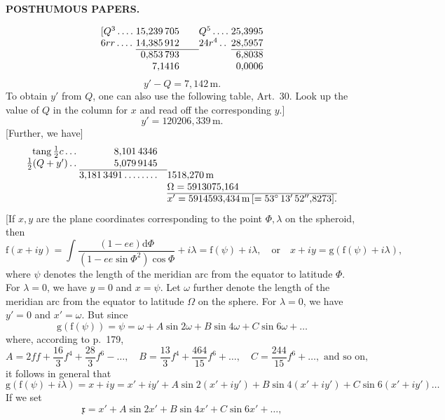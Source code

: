 \par\clearpage
{}\hfill{\small\textbf{POSTHUMOUS PAPERS.}}\hfill\null\par\medskip
\[
\begin{array}{@{}l@{\;}r@{\qquad}l@{\;}r@{}}
[Q^3\,.\,.\,.\,.&15{,}239\,705&Q^5\,.\,.\,.\,.&25{,}3995\\
6rr\,.\,.\,.\,.&14{,}385\,912&24r^4\,.\,.&28{,}5957\\\cline{2-2}\cline{4-4}
&0{,}853\,793&&6{,}8038\\
&7{,}1416&&0{,}0006
\end{array}
\]
\[y'-Q=7{,}142\,\mathrm{m}.\]
To obtain \(y'\) from \(Q\), one can also use the following table, Art.~30. Look up the value of \(Q\) in the column for \(x\) and read off the corresponding \(y\).]
\[y'=120206{,}339\,\mathrm{m}.\]
[Further, we have]
\[
\begin{array}{@{}r@{\;}r@{\quad}l@{}}
\operatorname{tang}\tfrac12c\,.\,.\,.&8{,}101\,4346&\\
\tfrac12(Q+y')\,.\,.&5{,}079\,9145&\\\cline{2-2}
&3{,}181\,3491\,.\,.\,.\,.\,.\,.\,.\,.&1518{,}270\,\mathrm{m}\\
&&\Omega=5913075{,}164\\\cline{3-3}
&&x'=5914593{,}434\,\mathrm{m}\,[=53^\circ\,13'\,52''{,}8273].
\end{array}
\]
[If \(x,y\) are the plane coordinates corresponding to the point \(\Phi,\lambda\) on the spheroid, then
\[
\mathrm{f}(x+iy)=\int\frac{(1-ee)\mathrm{d}\Phi}{(1-ee\sin\Phi^2)\cos\Phi}+i\lambda
=\mathrm{f}(\psi)+i\lambda,\quad\text{or}\quad x+iy=\mathrm{g}(\mathrm{f}(\psi)+i\lambda),
\]
\noindent where \(\psi\) denotes the length of the meridian arc from the equator to latitude \(\Phi\). For \(\lambda=0\), we have \(y=0\) and \(x=\psi\). Let \(\omega\) further denote the length of the meridian arc from the equator to latitude \(\Omega\) on the sphere. For \(\lambda=0\), we have \(y'=0\) and \(x'=\omega\). But since
\[
\mathrm{g}(\mathrm{f}(\psi))=\psi=\omega+A\sin2\omega+B\sin4\omega+C\sin6\omega+\ldots
\]
\noindent where, according to p.~179,
\[
A=2ff+\frac{16}{3}f^4+\frac{28}{3}f^6-\ldots,\quad
B=\frac{13}{3}f^4+\frac{464}{15}f^6+\ldots,\quad
C=\frac{244}{15}f^6+\ldots,\text{ and so on,}
\]
\noindent it follows in general that
\[
\mathrm{g}(\mathrm{f}(\psi)+i\lambda)=x+iy=x'+iy'+A\sin2(x'+iy')+B\sin4(x'+iy')+C\sin6(x'+iy')\ldots
\]
If we set
\[\mathfrak{x}=x'+A\sin2x'+B\sin4x'+C\sin6x'+\ldots,\]

